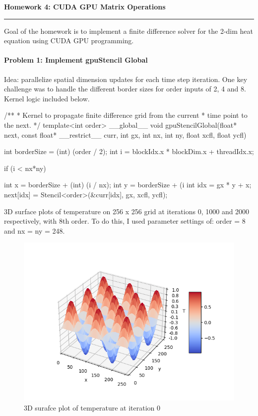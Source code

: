 \documentclass[12pt,letterpaper,twoside]{article}
\begin{document}
{\centering \textbf{Homework 4: CUDA GPU Matrix Operations\\}}
\vspace*{-8pt}\noindent\rule{\linewidth}{1pt}

Goal of the homework is to implement a finite difference solver for the
2-dim heat equation using CUDA GPU programming.

\paragraph{Problem 1: Implement gpuStencil Global } Idea: parallelize spatial
dimension updates for each time step iteration. One key challenge was to handle
the different border sizes for order inputs of 2, 4 and 8. Kernel logic included
below.

\begin{cpp}
/**
 * Kernel to propagate finite difference grid from the current
 * time point to the next.
 */
template<int order>
__global__
void gpuStencilGlobal(float* next, const float* __restrict__ curr, 
                      int gx, int nx, int ny, float xcfl, float ycfl) {
    
    int borderSize = (int) (order / 2);
    int i = blockIdx.x * blockDim.x + threadIdx.x;
   
    if (i < nx*ny) {
	int x = borderSize + (int) (i / nx);
	int y = borderSize + (i %
        int idx = gx * y + x;   
        next[idx] = Stencil<order>(&curr[idx], gx, xcfl, ycfl);
    
    }
}
\end{cpp}

3D surface plots of temperature on 256 x 256 grid at iterations 0, 1000 and 
2000 respectively, with 8th order. To do this, I used parameter settings of:
order = 8 and nx = ny = 248.

\begin{figure}[h]
    \center
    \includegraphics[scale=0.7]{global_0000.png}
    \caption{3D surafce plot of temperature at iteration 0}
\end{figure}
\end{document}
